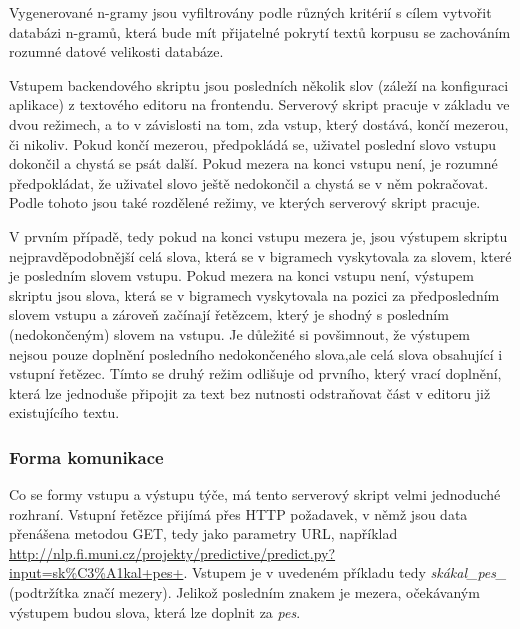 \documentclass[a4paper,11pt]{article}
\begin{document}

Vygenerované n-gramy jsou vyfiltrovány podle různých kritérií s cílem vytvořit databázi n-gramů, která bude mít přijatelné pokrytí textů korpusu se zachováním rozumné datové velikosti databáze.



Vstupem backendového skriptu jsou posledních několik slov (záleží na konfiguraci aplikace) z textového editoru na frontendu. Serverový skript pracuje v základu ve dvou režimech, a to v závislosti na tom, zda vstup, který dostává, končí mezerou, či nikoliv. Pokud končí mezerou, předpokládá se, uživatel poslední slovo vstupu dokončil a chystá se psát další. Pokud mezera na konci vstupu není, je rozumné předpokládat, že uživatel slovo ještě nedokončil a chystá se v něm pokračovat. Podle tohoto jsou také rozdělené režimy, ve kterých serverový skript pracuje. 

V prvním případě, tedy pokud na konci vstupu mezera je, jsou výstupem skriptu nejpravděpodobnější celá slova, která se v bigramech vyskytovala za slovem, které je posledním slovem vstupu. Pokud mezera na konci vstupu není, výstupem skriptu jsou slova, která se v bigramech vyskytovala na pozici za předposledním slovem vstupu a zároveň začínají řetězcem, který je shodný s posledním (nedokončeným) slovem na vstupu. Je důležité si povšimnout, že výstupem nejsou pouze doplnění posledního nedokončeného slova,ale celá slova obsahující i vstupní řetězec. Tímto se druhý režim odlišuje od prvního, který vrací doplnění, která lze jednoduše připojit za text bez nutnosti odstraňovat část v editoru již existujícího textu.

\subsubsection{Forma komunikace}

Co se formy vstupu a výstupu týče, má tento serverový skript velmi jednoduché rozhraní. Vstupní řetězce přijímá přes HTTP požadavek, v němž jsou data přenášena metodou GET, tedy jako parametry URL, například \url{http://nlp.fi.muni.cz/projekty/predictive/predict.py?input=sk%C3%A1kal+pes+}. Vstupem je v uvedeném příkladu tedy {\it skákal\_pes\_} (podtržítka značí mezery). Jelikož posledním znakem je mezera, očekávaným výstupem budou slova, která lze doplnit za {\it pes}. 
\end{document}
